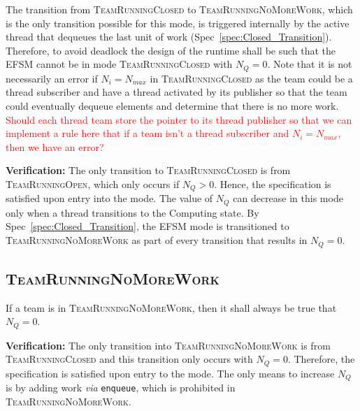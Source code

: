 \documentclass{article}
\newcommand{\TeamRunningOpen}   {\textsc{TeamRunningOpen}}
\newcommand{\TeamRunningClosed} {\textsc{TeamRunningClosed}}
\newcommand{\TeamRunningNoMoreWork} {\textsc{TeamRunningNoMoreWork}}
\begin{document}
\begin{spec}
\label{spec:Closed_NoWork}
The transition from {\TeamRunningClosed} to \TeamRunningNoMoreWork, which is the
only transition possible for this mode, is triggered internally by the active
thread that dequeues the last unit of work (Spec~\ref{spec:Closed_Transition}).
Therefore, to avoid deadlock the design of the runtime shall be such that the
EFSM cannot be in mode {\TeamRunningClosed} with $N_Q = 0$.  Note that it is not
necessarily an error if $N_i = N_{max}$ in {\TeamRunningClosed} as the team
could be a thread subscriber and have a thread activated by its publisher so
that the team could eventually dequeue elements and determine that there is no
more work.
\textcolor{red}{Should each thread team store the pointer to its thread
publisher so that we can implement a rule here that if a team isn't a thread
subscriber and $N_i = N_{max}$, then we have an error?}
\end{spec}
\textbf{Verification:}\hspace{0.125in}  The only transition to
{\TeamRunningClosed} is from {\TeamRunningOpen}, which only occurs if $N_Q > 0$.
Hence, the specification is satisfied upon entry into the mode.  The value of
$N_Q$ can decrease in this mode only when a thread transitions to the Computing
state.   By Spec~\ref{spec:Closed_Transition}, the EFSM mode is transitioned to
{\TeamRunningNoMoreWork} as part of every transition that results in $N_Q = 0$.

\subsection{\TeamRunningNoMoreWork}
\begin{spec}
\label{spec:NoMoreWork_NoWork}
If a team is in \TeamRunningNoMoreWork, then it shall always be true that $N_Q =
0$.
\end{spec}
\textbf{Verification:}\hspace{0.125in}  The only transition into
{\TeamRunningNoMoreWork} is from {\TeamRunningClosed} and this transition only
occurs with $N_Q = 0$.  Therefore, the specification is satisfied upon entry to
the mode.  The only means to increase $N_Q$ is by adding work \textit{via}
\texttt{enqueue}, which is prohibited in \TeamRunningNoMoreWork.
\end{document}
